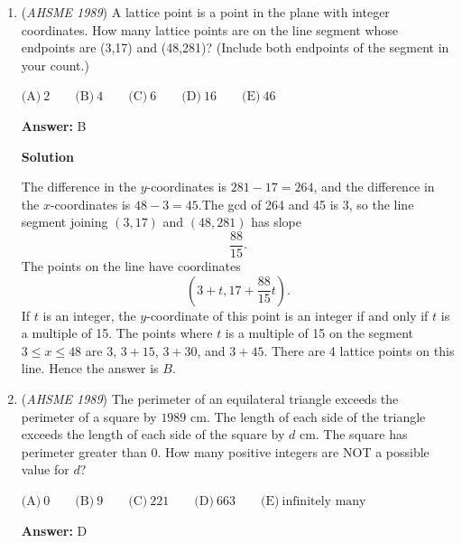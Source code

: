 \begin{enumerate}
Let $x = AD$.

 By Stewart's Theorem, $(BD)^2(AC) + (AC)(AD)(DC) = (AB)^2(CD) + (BC)^2(AD)$.  

 Substituting yields $5^2(9) + 9x(9-x) = 5^2 (9-x) +7^2(x)$ which simplifies to $-9x^2 + 81x + 225 = 225 + 24x$.  Collecting all terms on one side yields $9x^2 - 57x = 0$, which factors as $3x(3x-19)=0$.  Since $x$ is positive, $x = \frac{19}{3}$.

 Therefore, $DC = 9 - \frac{19}{3} = \frac{8}{3}$ and $AD : DC = \boxed{\textbf{(E)}\ 19 : 8}$.

 


	\item (\textit{AHSME 1989}) A lattice point is a point in the plane with integer coordinates. How many lattice points are on the line segment whose endpoints are (3,17) and (48,281)? (Include both endpoints of the segment in your count.)


 $\textrm{(A)}\ 2\qquad\textrm{(B)}\ 4\qquad\textrm{(C)}\ 6\qquad\textrm{(D)}\ 16\qquad\textrm{(E)}\ 46$

 \textbf{Answer: }B



\textbf{Solution}

The difference in the $y$-coordinates is $281 - 17 = 264$, and the difference in the $x$-coordinates is $48 - 3 = 45$.The gcd of 264 and 45 is 3, so the line segment joining $(3,17)$ and $(48,281)$ has slope
 \[\frac{88}{15}.\]The points on the line have coordinates
 \[\left(3+t,17+\frac{88}{15}t\right).\]If $t$ is an integer, the $y$-coordinate of this point is an integer if and only if $t$ is a multiple of 15. The points where $t$ is a multiple of 15 on the segment $3\leq x\leq 48$ are $3$, $3+15$, $3+30$, and $3+45$. There are 4 lattice points on this line. Hence the answer is $\boxed{B}$.

 


	\item (\textit{AHSME 1989}) The perimeter of an equilateral triangle exceeds the perimeter of a square by $1989$ cm. The length of each side of the triangle exceeds the length of each side of the square by $d$ cm. The square has perimeter greater than 0. How many positive integers are NOT a possible value for $d$?


 $\textrm{(A)}\ 0\qquad\textrm{(B)}\ 9\qquad\textrm{(C)}\ 221\qquad\textrm{(D)}\ 663\qquad\textrm{(E)}\ \text{infinitely many}$

 \textbf{Answer: }D




\end{enumerate}
